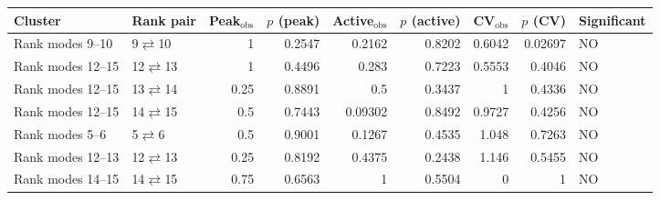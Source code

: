 \begin{tabular}{llrrrrrrl}
\toprule
Cluster & Rank pair & Peak$_{\mathrm{obs}}$ & $p$ (peak) & Active$_{\mathrm{obs}}$ & $p$ (active) & CV$_{\mathrm{obs}}$ & $p$ (CV) & Significant \\
\midrule
Rank modes 9--10 & 9$\rightleftarrows$10 & 1 & 0.2547 & 0.2162 & 0.8202 & 0.6042 & 0.02697 & NO \\
Rank modes 12--15 & 12$\rightleftarrows$13 & 1 & 0.4496 & 0.283 & 0.7223 & 0.5553 & 0.4046 & NO \\
Rank modes 12--15 & 13$\rightleftarrows$14 & 0.25 & 0.8891 & 0.5 & 0.3437 & 1 & 0.4336 & NO \\
Rank modes 12--15 & 14$\rightleftarrows$15 & 0.5 & 0.7443 & 0.09302 & 0.8492 & 0.9727 & 0.4256 & NO \\
Rank modes 5--6 & 5$\rightleftarrows$6 & 0.5 & 0.9001 & 0.1267 & 0.4535 & 1.048 & 0.7263 & NO \\
Rank modes 12--13 & 12$\rightleftarrows$13 & 0.25 & 0.8192 & 0.4375 & 0.2438 & 1.146 & 0.5455 & NO \\
Rank modes 14--15 & 14$\rightleftarrows$15 & 0.75 & 0.6563 & 1 & 0.5504 & 0 & 1 & NO \\
\bottomrule
\end{tabular}

